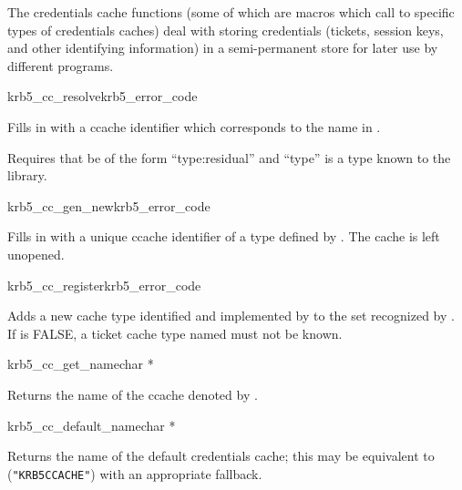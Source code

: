 The credentials cache functions (some of which are macros which call to
specific types of credentials caches) deal with storing credentials
(tickets, session keys, and other identifying information) in a
semi-permanent store for later use by different programs.

\begin{funcdecl}{krb5_cc_resolve}{krb5_error_code}{\funcinout}
\funcin
{}
\funcout
{}
\end{funcdecl}

Fills in  with a ccache identifier which corresponds to
the name in .  

Requires that  be of the form ``type:residual'' and
``type'' is a type known to the library.

\begin{funcdecl}{krb5_cc_gen_new}{krb5_error_code}{\funcinout}
\funcin
{}
\funcout
{}
\end{funcdecl}


Fills in  with a unique ccache identifier of a type defined by
.  The cache is left unopened.

\begin{funcdecl}{krb5_cc_register}{krb5_error_code}{\funcinout}
\funcin
{}
\end{funcdecl}

Adds a new cache type identified and implemented by  to
the set recognized by .
If  is FALSE, a ticket cache type named
 must not be known.

\begin{funcdecl}{krb5_cc_get_name}{char *}{\funcinout}
\funcin
{}
\end{funcdecl}

Returns the name of the ccache denoted by .

\begin{funcdecl}{krb5_cc_default_name}{char *}{\funcinout}
\end{funcdecl}

Returns the name of the default credentials cache; this may be equivalent to
({\tt "KRB5CCACHE"}) with an appropriate fallback.

